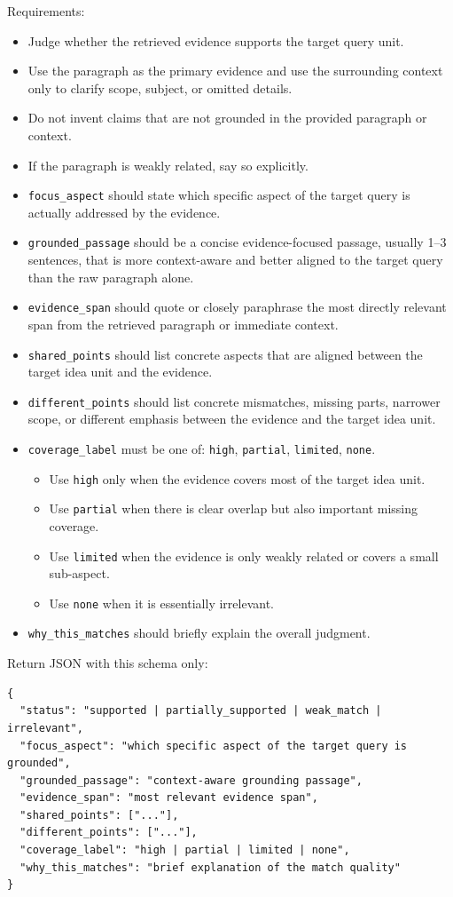 \documentclass{llmxive}
\begin{document}
\begin{tcolorbox}
Requirements:
\begin{itemize}\small
\item Judge whether the retrieved evidence supports the target query unit.
\item Use the paragraph as the primary evidence and use the surrounding context only to clarify scope, subject, or omitted details.
\item Do not invent claims that are not grounded in the provided paragraph or context.
\item If the paragraph is weakly related, say so explicitly.
\item \texttt{focus\_aspect} should state which specific aspect of the target query is actually addressed by the evidence.
\item \texttt{grounded\_passage} should be a concise evidence-focused passage, usually 1--3 sentences, that is more context-aware and better aligned to the target query than the raw paragraph alone.
\item \texttt{evidence\_span} should quote or closely paraphrase the most directly relevant span from the retrieved paragraph or immediate context.
\item \texttt{shared\_points} should list concrete aspects that are aligned between the target idea unit and the evidence.
\item \texttt{different\_points} should list concrete mismatches, missing parts, narrower scope, or different emphasis between the evidence and the target idea unit.
\item \texttt{coverage\_label} must be one of: \texttt{high}, \texttt{partial}, \texttt{limited}, \texttt{none}.
  \begin{itemize}\small
  \item Use \texttt{high} only when the evidence covers most of the target idea unit.
  \item Use \texttt{partial} when there is clear overlap but also important missing coverage.
  \item Use \texttt{limited} when the evidence is only weakly related or covers a small sub-aspect.
  \item Use \texttt{none} when it is essentially irrelevant.
  \end{itemize}
\item \texttt{why\_this\_matches} should briefly explain the overall judgment.
\end{itemize}

Return JSON with this schema only:
\begin{verbatim}
{
  "status": "supported | partially_supported | weak_match | irrelevant",
  "focus_aspect": "which specific aspect of the target query is grounded",
  "grounded_passage": "context-aware grounding passage",
  "evidence_span": "most relevant evidence span",
  "shared_points": ["..."],
  "different_points": ["..."],
  "coverage_label": "high | partial | limited | none",
  "why_this_matches": "brief explanation of the match quality"
}
\end{verbatim}
\end{tcolorbox}
\end{document}
